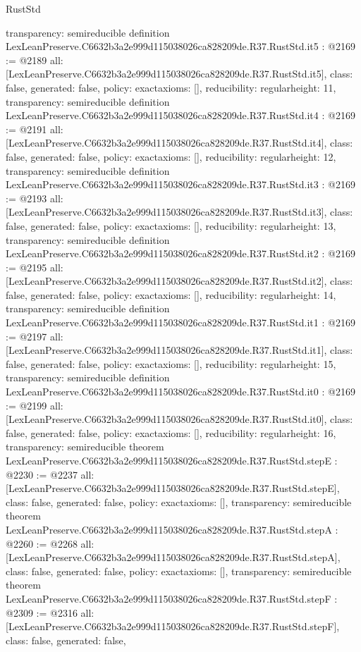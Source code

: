 \begin{lexlean}{RustStd}
\begin{coremodule}
{  transparency: semireducible
}
definition LexLeanPreserve.C6632b3a2e999d115038026ca828209de.R37.RustStd.it5 : @2169 := @2189 {
  all: [LexLeanPreserve.C6632b3a2e999d115038026ca828209de.R37.RustStd.it5],
  class: false,
  generated: false,
  policy: exact{axioms: []},
  reducibility: regular{height: 11},
  transparency: semireducible
}
definition LexLeanPreserve.C6632b3a2e999d115038026ca828209de.R37.RustStd.it4 : @2169 := @2191 {
  all: [LexLeanPreserve.C6632b3a2e999d115038026ca828209de.R37.RustStd.it4],
  class: false,
  generated: false,
  policy: exact{axioms: []},
  reducibility: regular{height: 12},
  transparency: semireducible
}
definition LexLeanPreserve.C6632b3a2e999d115038026ca828209de.R37.RustStd.it3 : @2169 := @2193 {
  all: [LexLeanPreserve.C6632b3a2e999d115038026ca828209de.R37.RustStd.it3],
  class: false,
  generated: false,
  policy: exact{axioms: []},
  reducibility: regular{height: 13},
  transparency: semireducible
}
definition LexLeanPreserve.C6632b3a2e999d115038026ca828209de.R37.RustStd.it2 : @2169 := @2195 {
  all: [LexLeanPreserve.C6632b3a2e999d115038026ca828209de.R37.RustStd.it2],
  class: false,
  generated: false,
  policy: exact{axioms: []},
  reducibility: regular{height: 14},
  transparency: semireducible
}
definition LexLeanPreserve.C6632b3a2e999d115038026ca828209de.R37.RustStd.it1 : @2169 := @2197 {
  all: [LexLeanPreserve.C6632b3a2e999d115038026ca828209de.R37.RustStd.it1],
  class: false,
  generated: false,
  policy: exact{axioms: []},
  reducibility: regular{height: 15},
  transparency: semireducible
}
definition LexLeanPreserve.C6632b3a2e999d115038026ca828209de.R37.RustStd.it0 : @2169 := @2199 {
  all: [LexLeanPreserve.C6632b3a2e999d115038026ca828209de.R37.RustStd.it0],
  class: false,
  generated: false,
  policy: exact{axioms: []},
  reducibility: regular{height: 16},
  transparency: semireducible
}
theorem LexLeanPreserve.C6632b3a2e999d115038026ca828209de.R37.RustStd.stepE : @2230 := @2237 {
  all: [LexLeanPreserve.C6632b3a2e999d115038026ca828209de.R37.RustStd.stepE],
  class: false,
  generated: false,
  policy: exact{axioms: []},
  transparency: semireducible
}
theorem LexLeanPreserve.C6632b3a2e999d115038026ca828209de.R37.RustStd.stepA : @2260 := @2268 {
  all: [LexLeanPreserve.C6632b3a2e999d115038026ca828209de.R37.RustStd.stepA],
  class: false,
  generated: false,
  policy: exact{axioms: []},
  transparency: semireducible
}
theorem LexLeanPreserve.C6632b3a2e999d115038026ca828209de.R37.RustStd.stepF : @2309 := @2316 {
  all: [LexLeanPreserve.C6632b3a2e999d115038026ca828209de.R37.RustStd.stepF],
  class: false,
  generated: false,
}
\end{coremodule}
\end{lexlean}
